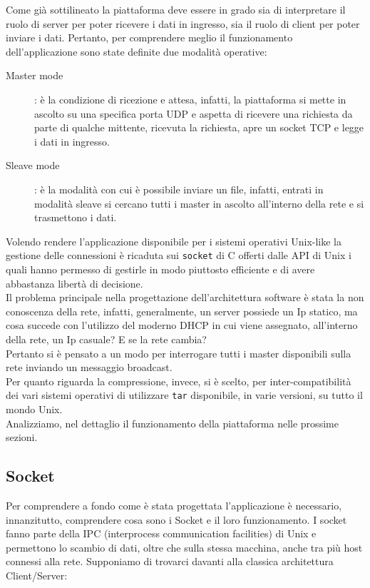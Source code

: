 \documentclass[11pt,fleqn]{book} %
\begin{document}
Come già sottilineato la piattaforma deve essere in grado sia di interpretare il ruolo di server per poter ricevere i dati in ingresso, sia il ruolo di client per poter inviare i dati. Pertanto, per comprendere meglio il funzionamento dell'applicazione sono state definite due modalità operative:
\medskip
\begin{description}
\item[Master mode] : è la condizione di ricezione e attesa, infatti, la piattaforma si mette in ascolto su una specifica porta UDP e aspetta di ricevere una richiesta da parte di qualche mittente, ricevuta la richiesta, apre un socket TCP e legge i dati in ingresso.
\item [Sleave mode]: è la modalità con cui è possibile inviare un file, infatti, entrati in modalità sleave si cercano tutti i master in ascolto all'interno della rete e si trasmettono i dati.
\end{description}

\medskip
\noindent Volendo rendere l'applicazione disponibile per i sistemi operativi Unix-like la gestione delle connessioni è ricaduta sui \texttt{socket} di C offerti dalle API di Unix i quali hanno permesso di gestirle in modo piuttosto efficiente e di avere abbastanza libertà di decisione.\\
\noindent Il problema principale nella progettazione dell'architettura software è stata la non conoscenza della rete, infatti, generalmente, un server possiede un Ip statico, ma cosa succede con l'utilizzo del moderno DHCP in cui viene assegnato, all'interno della rete, un Ip casuale? E se la rete cambia?\\
\noindent Pertanto si è pensato a un modo per interrogare tutti i master disponibili sulla rete inviando un messaggio broadcast.\\
\noindent Per quanto riguarda la compressione, invece, si è scelto, per inter-compatibilità dei vari sistemi operativi di utilizzare \texttt{tar} disponibile, in varie versioni, su tutto il mondo Unix.\\
\noindent Analizziamo, nel dettaglio il funzionamento della piattaforma nelle prossime sezioni.

\subsection{Socket}
Per comprendere a fondo come è stata progettata l'applicazione è necessario, innanzitutto, comprendere cosa sono i Socket e il loro funzionamento.
I socket fanno parte della IPC (interprocess communication facilities) di Unix e permettono lo scambio di dati, oltre che sulla stessa macchina, anche tra più host connessi alla rete. Supponiamo di trovarci davanti alla classica architettura Client/Server:
\medskip
\end{document}
